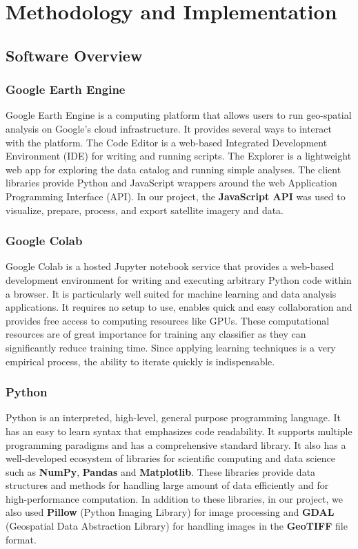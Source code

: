 \documentclass[12pt, a4paper]{report}
\begin{document}
\chapter{Methodology and Implementation}

\section{Software Overview}
\subsection{Google Earth Engine}
Google Earth Engine is a computing platform that allows users to run geo-spatial analysis on Google's cloud infrastructure. It provides several ways to interact with the platform. The Code Editor is a web-based Integrated Development Environment (IDE) for writing and running scripts. The Explorer is a lightweight web app for exploring the data catalog and running simple analyses. The client libraries provide Python and JavaScript wrappers around the web Application Programming Interface (API).\cite{gee1} In our project, the \textbf{JavaScript API} was used to visualize, prepare, process, and export satellite imagery and data.
\subsection{Google Colab}
Google Colab is a hosted Jupyter notebook service that provides a web-based development environment for writing and executing arbitrary Python code within a browser. It is particularly well suited for machine learning and data analysis applications. It requires no setup to use, enables quick and easy collaboration and provides free access to computing resources like GPUs.\cite{colab} These computational resources are of great importance for training any classifier as they can significantly reduce training time. Since applying learning techniques is a very empirical process, the ability to iterate quickly is indispensable.
\subsection{Python}
Python is an interpreted, high-level, general purpose programming language. It has an easy to learn syntax that emphasizes code readability. It supports multiple programming paradigms and has a comprehensive standard library. It also has a well-developed ecosystem of libraries for scientific computing and data science such as \textbf{NumPy}, \textbf{Pandas} and \textbf{Matplotlib}. These libraries provide data structures and methods for handling large amount of data efficiently and for high-performance computation. In addition to these libraries, in our project, we also used \textbf{Pillow} (Python Imaging Library) for image processing and \textbf{GDAL} (Geospatial Data Abstraction Library) for handling images in the \textbf{GeoTIFF} file format.
\end{document}
